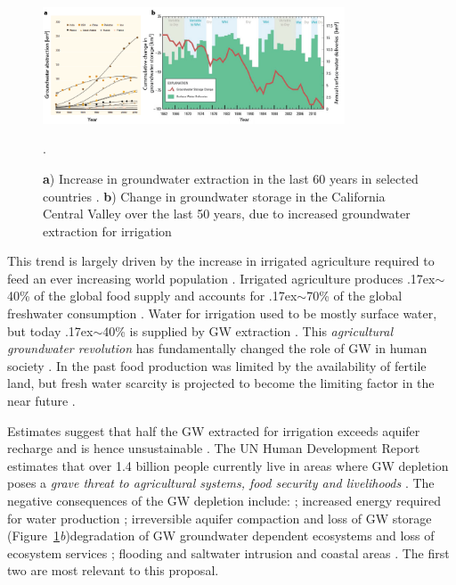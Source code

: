\documentclass[11pt,final]{article}%
\newcommand{\mytilde}{\raise.17ex\hbox{$\scriptstyle\mathtt{\sim}$}}
\begin{document}
\begin{figure}[h]
\centering
\noindent\includegraphics[width=0.8\textwidth]{Figures/Figure1.png}
\caption{\textbf{a}) Increase in groundwater extraction in the last 60 years in selected countries \cite[modified from][]{UNESCO2012}. \textbf{b})  Change in groundwater storage in the California Central Valley over the last 50 years, due to increased groundwater extraction for irrigation \cite[modified from][]{Faunt2016}}.
\label{fig:GW Intro}
\end{figure}

This trend is largely driven by the increase in irrigated agriculture required to feed an ever increasing world population \cite{Wada2010,Hoekstra2012}. Irrigated agriculture produces \mytilde 40\% of the global food supply and accounts for \mytilde70\% of the global freshwater consumption \cite{Siebert2010,Kummu2014}. Water for irrigation used to be mostly surface water, but today \mytilde 40\% is supplied by GW extraction \cite{Rost2008,Vorosmarty2000}. This \emph{agricultural groundwater revolution} has fundamentally changed the role of GW in human society \cite{UNESCO2012}. In the past food production was limited by the availability of fertile land, but fresh water scarcity is projected to become the limiting factor in the near future \cite{Watkins2006,Sauer2010,Hanjra2010}. 


Estimates suggest that half the GW extracted for irrigation exceeds aquifer recharge and is hence unsustainable \cite{Rost2008,Vorosmarty2000}. The UN Human Development Report estimates that over 1.4 billion people currently live in areas where GW depletion poses a \emph{grave threat to agricultural systems, food security and livelihoods} \cite{UNESCO2012}. The negative consequences of the GW depletion include: ; increased energy required for water production \cite{Scanlon2012,Narayanamoorthy2015}; irreversible aquifer compaction and loss of GW storage (Figure~\ref{fig:GW Intro}\emph{b})degradation of GW groundwater dependent ecosystems and loss of ecosystem services \cite{Klove2014,Doody2017}; flooding and saltwater intrusion and coastal areas \cite{Erban2014b,Alfarrah2018}.  The first two are most relevant to this proposal.
\end{document}
